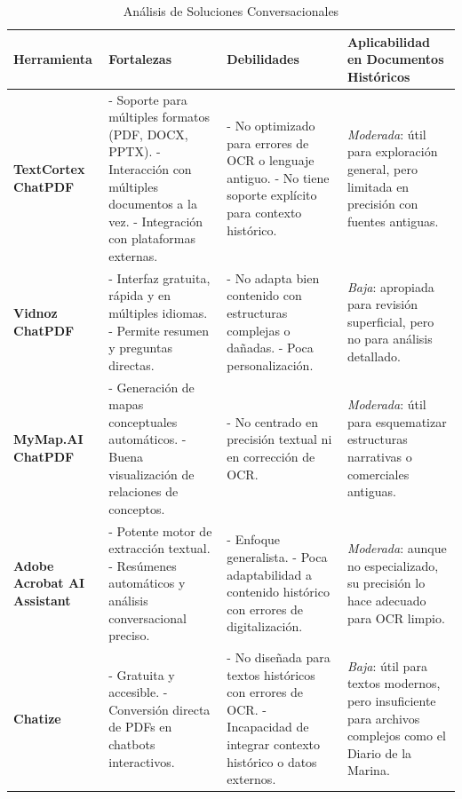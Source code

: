\begin{longtable}{p{3.2cm} p{4.5cm} p{4.5cm} p{3.5cm}}
	\caption{Análisis de Soluciones Conversacionales} \label{tab:Análisis de Soluciones Conversacionales} \\ 
	\toprule
	\textbf{Herramienta} & \textbf{Fortalezas} & \textbf{Debilidades} & \textbf{Aplicabilidad en Documentos Históricos} \\
	\midrule
	\textbf{TextCortex ChatPDF} &
	- Soporte para múltiples formatos (PDF, DOCX, PPTX). \newline
	- Interacción con múltiples documentos a la vez. \newline
	- Integración con plataformas externas. &
	- No optimizado para errores de OCR o lenguaje antiguo. \newline
	- No tiene soporte explícito para contexto histórico. &
	\textit{Moderada}: útil para exploración general, pero limitada en precisión con fuentes antiguas. \\
	\midrule
	\textbf{Vidnoz ChatPDF} &
	- Interfaz gratuita, rápida y en múltiples idiomas. \newline
	- Permite resumen y preguntas directas. &
	- No adapta bien contenido con estructuras complejas o dañadas. \newline
	- Poca personalización. &
	\textit{Baja}: apropiada para revisión superficial, pero no para análisis detallado. \\
	\midrule
	\textbf{MyMap.AI ChatPDF} &
	- Generación de mapas conceptuales automáticos. \newline
	- Buena visualización de relaciones de conceptos. &
	- No centrado en precisión textual ni en corrección de OCR. &
	\textit{Moderada}: útil para esquematizar estructuras narrativas o comerciales antiguas. \\
	\midrule
	\textbf{Adobe Acrobat AI Assistant} &
	- Potente motor de extracción textual. \newline
	- Resúmenes automáticos y análisis conversacional preciso. &
	- Enfoque generalista. \newline
	- Poca adaptabilidad a contenido histórico con errores de digitalización. &
	\textit{Moderada}: aunque no especializado, su precisión lo hace adecuado para OCR limpio. \\
	\midrule
	\textbf{Chatize} &
	- Gratuita y accesible. \newline
	- Conversión directa de PDFs en chatbots interactivos. &
	- No diseñada para textos históricos con errores de OCR. \newline
	- Incapacidad de integrar contexto histórico o datos externos. &
	\textit{Baja}: útil para textos modernos, pero insuficiente para archivos complejos como el Diario de la Marina. \\
	\bottomrule
\end{longtable}

